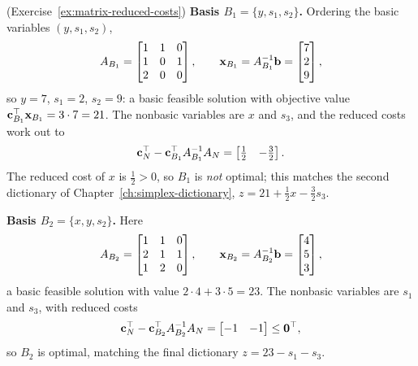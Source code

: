 \begin{solution}(Exercise~\ref{ex:matrix-reduced-costs})
\textbf{Basis \( B_1 = \{y, s_1, s_2\} \).}  Ordering the basic variables \( (y, s_1, s_2) \),
\[
A_{B_1} =
\begin{bmatrix}
1 & 1 & 0 \\
1 & 0 & 1 \\
2 & 0 & 0
\end{bmatrix},
\qquad
\mathbf{x}_{B_1} = A_{B_1}^{-1}\mathbf{b} = \begin{bmatrix} 7 \\ 2 \\ 9 \end{bmatrix},
\]
so \( y = 7 \), \( s_1 = 2 \), \( s_2 = 9 \): a basic feasible solution with objective value \( \mathbf{c}_{B_1}^\top \mathbf{x}_{B_1} = 3 \cdot 7 = 21 \).  The nonbasic variables are \( x \) and \( s_3 \), and the reduced costs work out to
\[
\mathbf{c}_N^\top - \mathbf{c}_{B_1}^\top A_{B_1}^{-1} A_N = \begin{bmatrix} \tfrac12 & -\tfrac32 \end{bmatrix}.
\]
The reduced cost of \( x \) is \( \tfrac12 > 0 \), so \( B_1 \) is \emph{not} optimal; this matches the second dictionary of Chapter~\ref{ch:simplex-dictionary}, \( z = 21 + \tfrac12 x - \tfrac32 s_3 \).

\textbf{Basis \( B_2 = \{x, y, s_2\} \).}  Here
\[
A_{B_2} =
\begin{bmatrix}
1 & 1 & 0 \\
2 & 1 & 1 \\
1 & 2 & 0
\end{bmatrix},
\qquad
\mathbf{x}_{B_2} = A_{B_2}^{-1}\mathbf{b} = \begin{bmatrix} 4 \\ 5 \\ 3 \end{bmatrix},
\]
a basic feasible solution with value \( 2 \cdot 4 + 3 \cdot 5 = 23 \).  The nonbasic variables are \( s_1 \) and \( s_3 \), with reduced costs
\[
\mathbf{c}_N^\top - \mathbf{c}_{B_2}^\top A_{B_2}^{-1} A_N = \begin{bmatrix} -1 & -1 \end{bmatrix} \leq \mathbf{0}^\top,
\]
so \( B_2 \) is optimal, matching the final dictionary \( z = 23 - s_1 - s_3 \).
\end{solution}

